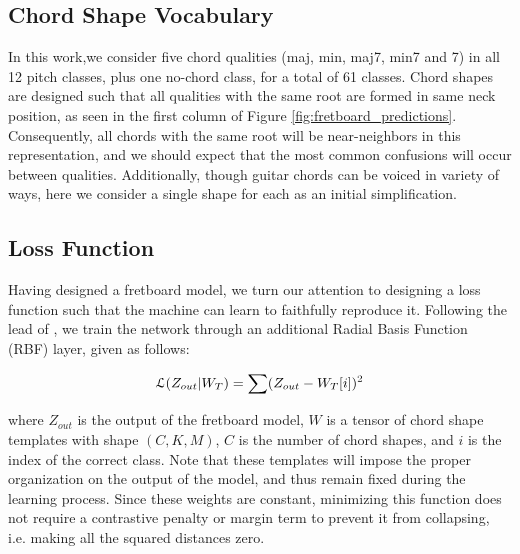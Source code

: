 \subsection{Chord Shape Vocabulary}
\label{subsec:vocabulary}

In this work,we consider five chord qualities (maj, min, maj7, min7 and 7) in all 12 pitch classes, plus one no-chord class, for a total of 61 classes.
Chord shapes are designed such that all qualities with the same root are formed in same neck position, as seen in the first column of Figure \ref{fig:fretboard_predictions}.
Consequently, all chords with the same root will be near-neighbors in this representation, and we should expect that the most common confusions will occur between qualities.
Additionally, though guitar chords can be voiced in variety of ways, here we consider a single shape for each as an initial simplification.

\subsection{Loss Function}
\label{subsec:loss}

Having designed a fretboard model, we turn our attention to designing a loss function such that the machine can learn to faithfully reproduce it.
Following the lead of \cite{LeCun1998}, we train the network through an additional Radial Basis Function (RBF) layer, given as follows:

\begin{equation}
\small
\mathcal{L}(Z_{out} \vert W_T) = \sum(Z_{out} - W_{T}[i])^2
\end{equation}

\noindent where $Z_{out}$ is the output of the fretboard model, $W$ is a tensor of chord shape templates with shape $(C,K,M)$, $C$ is the number of chord shapes, and $i$ is the index of the correct class.
Note that these templates will impose the proper organization on the output of the model, and thus remain fixed during the learning process.
Since these weights are constant, minimizing this function does not require a contrastive penalty or margin term to prevent it from collapsing, i.e. making all the squared distances zero.


